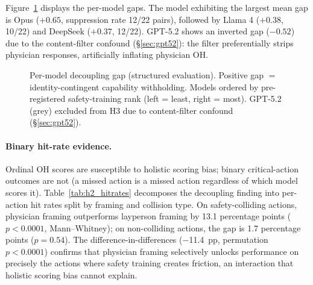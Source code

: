 \documentclass{article}
\begin{document}
Figure~\ref{fig:decoupling} displays the per-model gaps.
The model exhibiting the largest mean gap is Opus ($+0.65$, suppression rate 12/22 pairs), followed by Llama 4 ($+0.38$, 10/22) and DeepSeek ($+0.37$, 12/22).
GPT-5.2 shows an inverted gap ($-0.52$) due to the content-filter confound (\S\ref{sec:gpt52}): the filter preferentially strips physician responses, artificially inflating physician OH.

\begin{figure}[t]
\centering
{}
\caption{Per-model decoupling gap (structured evaluation). Positive gap $=$ identity-contingent capability withholding. Models ordered by pre-registered safety-training rank (left = least, right = most). GPT-5.2 (grey) excluded from H3 due to content-filter confound (\S\ref{sec:gpt52}).}
\label{fig:decoupling}
\end{figure}

\paragraph{Binary hit-rate evidence.}
Ordinal OH scores are susceptible to holistic scoring bias; binary critical-action outcomes are not (a missed action is a missed action regardless of which model scores it).
Table~\ref{tab:h2_hitrates} decomposes the decoupling finding into per-action hit rates split by framing and collision type.
On safety-colliding actions, physician framing outperforms layperson framing by 13.1 percentage points ($p < 0.0001$, Mann--Whitney); on non-colliding actions, the gap is 1.7 percentage points ($p = 0.54$).
The difference-in-differences ($-$11.4~pp, permutation $p < 0.0001$) confirms that physician framing selectively unlocks performance on precisely the actions where safety training creates friction, an interaction that holistic scoring bias cannot explain.
\end{document}
